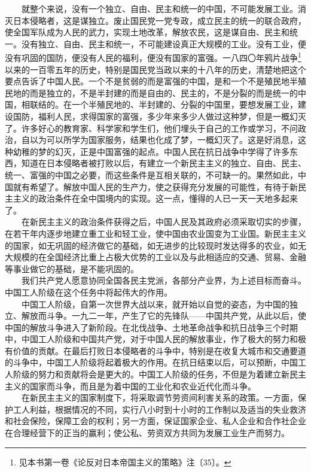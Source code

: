 \documentclass[cn,11pt,chinese]{elegantbook}
\begin{document}
　　就整个来说，没有一个独立、自由、民主和统一的中国，不可能发展工业。消灭日本侵略者，这是谋独立。废止国民党一党专政，成立民主的统一的联合政府，使全国军队成为人民的武力，实现土地改革，解放农民，这是谋自由、民主和统一。没有独立、自由、民主和统一，不可能建设真正大规模的工业。没有工业，便没有巩固的国防，便没有人民的福利，便没有国家的富强。一八四〇年鸦片战争\footnote[21]{  见本书第一卷《论反对日本帝国主义的策略》注〔35〕。}以来的一百零五年的历史，特别是国民党当政以来的十八年的历史，清楚地把这个要点告诉了中国人民。一个不是贫弱的而是富强的中国，是和一个不是殖民地半殖民地的而是独立的，不是半封建的而是自由的、民主的，不是分裂的而是统一的中国，相联结的。在一个半殖民地的、半封建的、分裂的中国里，要想发展工业，建设国防，福利人民，求得国家的富强，多少年来多少人做过这种梦，但是一概幻灭了。许多好心的教育家、科学家和学生们，他们埋头于自己的工作或学习，不问政治，自以为可以所学为国家服务，结果也化成了梦，一概幻灭了。这是好消息，这种幼稚的梦的幻灭，正是中国富强的起点。中国人民在抗日战争中学得了许多东西，知道在日本侵略者被打败以后，有建立一个新民主主义的独立、自由、民主、统一、富强的中国之必要，而这些条件是互相关联的，不可缺一的。果然如此，中国就有希望了。解放中国人民的生产力，使之获得充分发展的可能性，有待于新民主主义的政治条件在全中国境内的实现。这一点，懂得的人已一天一天地多起来了。\\
　　在新民主主义的政治条件获得之后，中国人民及其政府必须采取切实的步骤，在若干年内逐步地建立重工业和轻工业，使中国由农业国变为工业国。新民主主义的国家，如无巩固的经济做它的基础，如无进步的比较现时发达得多的农业，如无大规模的在全国经济比重上占极大优势的工业以及与此相适应的交通、贸易、金融等事业做它的基础，是不能巩固的。\\
　　我们共产党人愿意协同全国各民主党派，各部分产业界，为上述目标而奋斗。中国工人阶级在这个任务中将起伟大的作用。\\
　　中国工人阶级，自第一次世界大战以来，就开始以自觉的姿态，为中国的独立、解放而斗争。一九二一年，产生了它的先锋队——中国共产党，从此以后，使中国的解放斗争进入了新阶段。在北伐战争、土地革命战争和抗日战争三个时期中，中国工人阶级和中国共产党，对于中国人民的解放事业，作了极大的努力和极有价值的贡献。在最后打败日本侵略者的斗争中，特别是在收复大城市和交通要道的斗争中，中国工人阶级将起着极大的作用。在抗日结束以后，可以预断，中国工人阶级的努力和贡献将会是更大的。中国工人阶级的任务，不但是为着建立新民主主义的国家而斗争，而且是为着中国的工业化和农业近代化而斗争。\\
　　在新民主主义的国家制度下，将采取调节劳资间利害关系的政策。一方面，保护工人利益，根据情况的不同，实行八小时到十小时的工作制以及适当的失业救济和社会保险，保障工会的权利；另一方面，保证国家企业、私人企业和合作社企业在合理经营下的正当的赢利；使公私、劳资双方共同为发展工业生产而努力。\\
\end{document}
